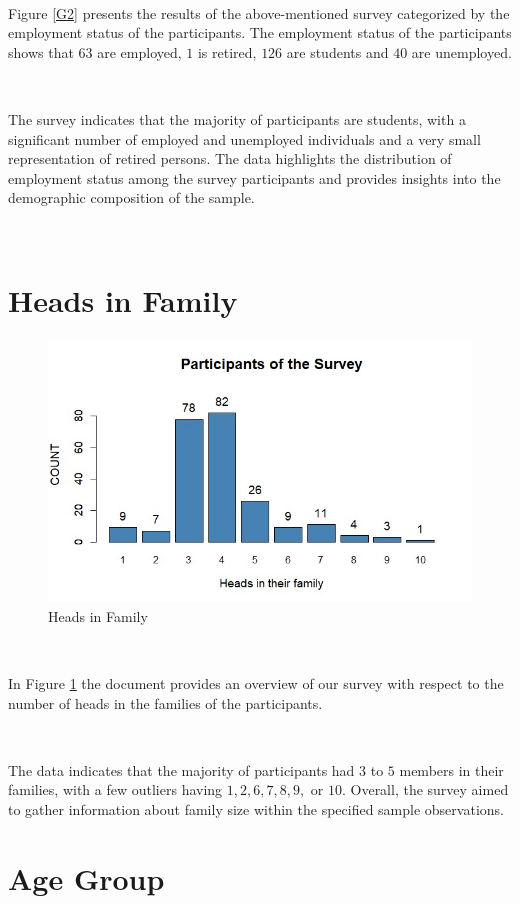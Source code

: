 \ 

Figure \ref{G2} presents the results of the above-mentioned survey categorized by the
employment status of the participants. The employment status of the participants shows
that $63$ are employed, $1$ is retired, $126$ are students and $40$ are unemployed.

\ 

The survey indicates that the majority of participants are students, with a significant number
of employed and unemployed individuals and a very small representation of retired persons.
The data highlights the distribution of\\ employment status among the survey participants
and provides insights into the demographic composition of the sample.

\ 

\section{Heads in Family}

\begin{figure}[h!]
	\centering
	\includegraphics[width=0.75\linewidth]{IMAGES/Image 3.jpg}
	\caption{Heads in Family}
	\label{G3}
\end{figure}

\ 

In Figure \ref{G3} the document provides an overview of our survey with respect to the number of heads in the families of the participants.

\

The data indicates that the majority of participants had $3$ to $5$ members in their families,
with a few outliers having $1, 2, 6, 7, 8, 9,$ or $10$. Overall, the survey aimed to gather
information about family size within the specified sample observations.

\section{Age Group}

